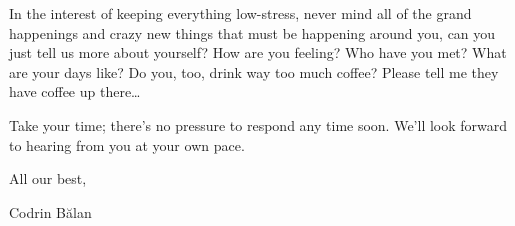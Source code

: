 In the interest of keeping everything low-stress, never mind all of the grand happenings and crazy new things that must be happening around you, can you just tell us more about yourself? How are you feeling? Who have you met? What are your days like? Do you, too, drink way too much coffee? Please tell me they have coffee up there\ldots{}

Take your time; there's no pressure to respond any time soon. We'll look forward to hearing from you at your own pace.

All our best,

Codrin Bălan
